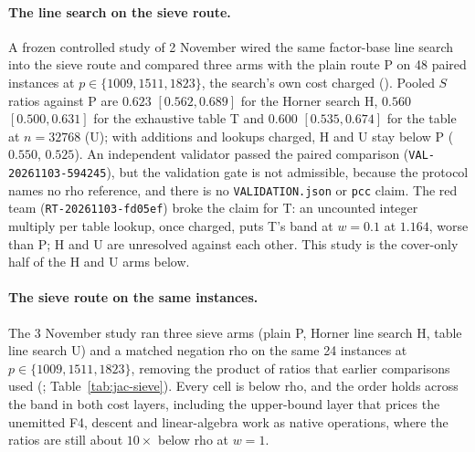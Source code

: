 \paragraph{The line search on the sieve route.} A frozen controlled study of
2 November wired the same factor-base line search into the sieve route and
compared three arms with the plain route P on 48 paired instances at
$p\in\{1009,1511,1823\}$, the search's own cost charged
(). Pooled $S$ ratios
against P are $0.623$ $[0.562,0.689]$ for the Horner search H, $0.560$
$[0.500,0.631]$ for the exhaustive table T and $0.600$ $[0.535,0.674]$ for the
table at $n=32768$ (U); with additions and lookups charged, H and U stay
below P ($0.550$, $0.525$). An independent validator passed the paired
comparison (\texttt{VAL-20261103-594245}), but the validation gate is not
admissible, because the protocol names no rho reference, and there is no
\texttt{VALIDATION.json} or \texttt{pcc} claim. The red team
(\texttt{RT-20261103-fd05ef}) broke the claim for T: an uncounted integer
multiply per table lookup, once charged, puts T's band at $w=0.1$ at $1.164$,
worse than P; H and U are unresolved against each other. This study is the
cover-only half of the H and U arms below.

\paragraph{The sieve route on the same instances.} The 3 November study ran
three sieve arms (plain P, Horner line search H, table line search U) and a
matched negation rho on the same 24 instances at $p\in\{1009,1511,1823\}$,
removing the product of ratios that earlier comparisons used
(;
Table~\ref{tab:jac-sieve}). Every cell is below rho, and the order holds
across the band in both cost layers, including the upper-bound layer that
prices the unemitted F4, descent and linear-algebra work as native
operations, where the ratios are still about $10\times$ below rho at $w=1$.

